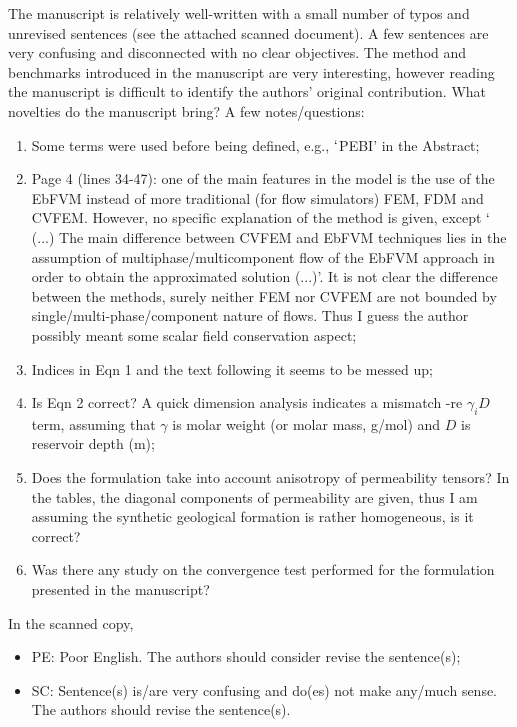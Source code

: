 \documentclass[14pt,twoside]{report}
\begin{document}
{{The manuscript is relatively well-written with a small number of typos and unrevised sentences (see the attached scanned document). A few sentences are very confusing and disconnected with no clear objectives. The method and benchmarks introduced in the manuscript are very interesting, however reading the manuscript is difficult to identify the authors' original contribution. What novelties do the manuscript bring? A few notes/questions:
\begin{enumerate}
%
\item Some terms were used before being defined, e.g., $\lq$PEBI' in the Abstract;
\item Page 4 (lines 34-47): one of the main features in the model is the use of the EbFVM instead of more traditional (for flow simulators) FEM, FDM and CVFEM. However, no specific explanation of the method is given, except $\lq$(...) The main difference between CVFEM and EbFVM techniques lies in the assumption of multiphase/multicomponent flow of the EbFVM approach in order to obtain the approximated solution (...)'. It is not clear the difference between the methods, surely neither FEM nor CVFEM are not bounded by single/multi-phase/component nature of flows. Thus I guess the author possibly meant some scalar field conservation aspect;
\item Indices in Eqn 1 and the text following it seems to be messed up; 
\item Is Eqn 2 correct? A quick dimension analysis indicates a mismatch -re $\gamma_{i}D$ term, assuming that $\gamma$ is molar weight (or molar mass, g/mol) and $D$ is reservoir depth (m);
\item Does the formulation take into account anisotropy of permeability tensors? In the tables, the diagonal components of permeability are given, thus I am assuming the synthetic geological formation is rather homogeneous, is it correct?
\item Was there any study on the convergence test performed for the formulation presented in the manuscript? 
%
\end{enumerate}
In the scanned copy,
\begin{itemize}
\item PE: Poor English. The authors should consider revise the sentence(s);
\item SC: Sentence(s) is/are very confusing and do(es) not make any/much sense. The authors should revise the sentence(s).
\end{itemize}

{
  


}}}
\end{document}
